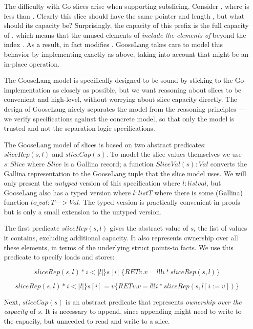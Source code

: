 The difficulty with Go slices arise when supporting subslicing. Consider
, where  is less than .
Clearly this slice should have the same pointer and length ,
but what should its capacity be? Surprisingly, the capacity of this
prefix is the full capacity of , which means that the unused
elements of  \emph{include the elements of }
beyond the index . As a result, 
in fact modifies . GooseLang takes care to model this
behavior by implementing  exactly as above, taking into
account that  might be an in-place operation.

The GooseLang model is specifically designed to be sound by sticking to
the Go implementation as closely as possible, but we want reasoning
about slices to be convenient and high-level, without worrying about
slice capacity directly. The design of GooseLang nicely separates the
model from the reasoning principles --- we verify specifications against
the concrete model, so that only the model is trusted and not the
separation logic specifications.

The GooseLang model of slices is based on two abstract predicates:
$sliceRep(s, l)$ and $sliceCap(s)$. To model the slice values
themselves we use $s : Slice$ where $Slice$ is a Gallina record; a
function $SliceVal(s) : Val$ converts the Gallina representation to
the GooseLang tuple that the slice model uses. We will only present the
\emph{untyped} version of this specification where $l : list val$, but
GooseLang also has a typed version where $l : list T$ where there is
some (Gallina) function $to\_val : T -> Val$. The typed version is
practically convenient in proofs but is only a small extension to the
untyped version.

The first predicate $sliceRep(s, l)$ gives the abstract value of
$s$, the list of values it contains, excluding additional capacity. It
also represents ownership over all these elements, in terms of the
underlying struct points-to facts. We use this predicate to specify
loads and stores:

\[
  sliceRep(s, l) * i < |l|\} s[i] \{RET v. v = l !! i * sliceRep(s, l)\}
\]

\[
  sliceRep(s, l) * i < |l|\} s[i] = v \{RET v. v = l !! i * sliceRep(s, l[i := v])\}
\]

Next, $sliceCap(s)$ is an abstract predicate that represents
\emph{ownership over the capacity} of $s$. It is necessary to append,
since appending might need to write to the capacity, but unneeded to
read and write to a slice.

